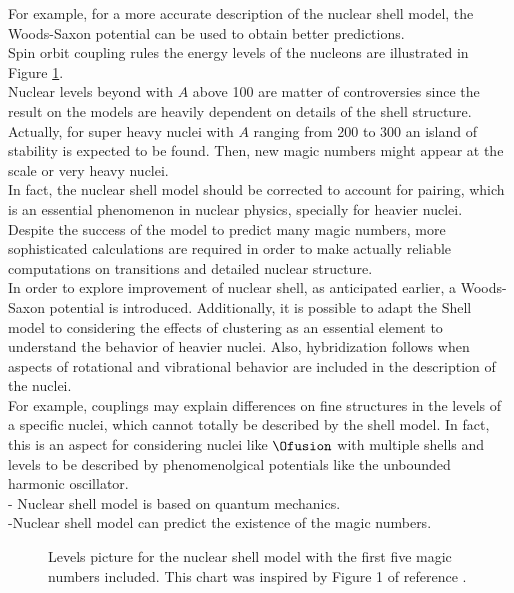 \documentclass[openany]{book}
\begin{document}
For example, for a more accurate description of the nuclear shell model, the Woods-Saxon potential can be used to obtain better predictions. \\

Spin orbit coupling rules the energy levels of the nucleons are illustrated in Figure \ref{fig:nuclerShellModelLevels}.  \\

Nuclear levels beyond with $A$ above 100 are matter of controversies since the result on the models are heavily dependent on details of the shell structure. Actually, for super heavy nuclei with $A$ ranging from 200 to 300 an island of stability is expected to be found. Then, new magic numbers might appear at the scale or very heavy nuclei.  \\

In fact, the nuclear shell model should be corrected to account for pairing, which is an essential phenomenon in nuclear physics, specially for heavier nuclei. Despite the success of the model to predict many magic numbers, more sophisticated calculations are required in order to make actually reliable computations on transitions and detailed nuclear structure. \\

In order to explore improvement of nuclear shell, as anticipated earlier, a Woods-Saxon potential is introduced. Additionally, it is possible to adapt the Shell model to considering the effects of clustering as an essential element to understand the behavior of heavier nuclei. Also, hybridization follows when aspects of rotational and vibrational behavior are included in the description of the nuclei.  \\

For example, couplings may explain differences on fine structures in the levels of a specific nuclei, which cannot totally be described by the shell model. In fact, this is an aspect for considering nuclei like $\Ofusion$ with multiple shells and levels to be described by phenomenolgical potentials like the unbounded harmonic oscillator. \\

- Nuclear shell model is based on quantum mechanics. \\

-Nuclear shell model can predict the existence of the magic numbers.

\begin{figure}[H]
	
	\caption[Nuclear shell model levels picture]{Levels picture for the nuclear shell model with the first five magic numbers included. This chart was inspired by Figure 1 of reference \cite{tran_ong_hagen_morris_aoi_suzuki_kanada-enyo_geng_terashima_tanihata_2018}. }
	\label{fig:nuclerShellModelLevels}
\end{figure}
\end{document}
